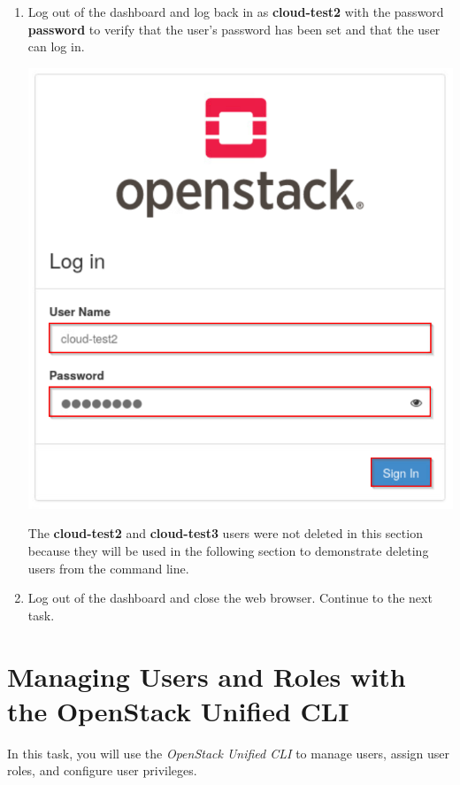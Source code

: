 \documentclass[letterpaper, 12pt]{article}
\begin{document}
\begin{enumerate}
    \item Log out of the dashboard and log back in as \textbf{cloud-test2} with the password \textbf{password} to verify
    that the user's password has been set and that the user can log in.


    \begin{center}
        \includegraphics[scale=0.5]{images/part3/step18.png}
    \end{center}

    \begin{notebox}
        The \textbf{cloud-test2} and \textbf{cloud-test3} users were not deleted in this section because they will be used in the following section to demonstrate deleting users from the command line.
    \end{notebox}

    \item Log out of the dashboard and close the web browser. Continue to the next task.
\end{enumerate}

\section{Managing Users and Roles with the OpenStack Unified CLI}
\label{sec:managing_users_using_the_openstack_unified_cli}
In this task, you will use the \textit{OpenStack Unified CLI} to manage users, assign user roles, and configure user privileges.
\end{document}
